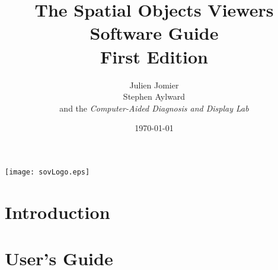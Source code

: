 \documentclass{InsightSoftwareGuide}
\title{The Spatial Objects Viewers\\Software Guide\\First Edition}
\author{Julien Jomier\\Stephen Aylward\\
and the \emph{Computer-Aided Diagnosis and Display Lab}}
\date{\today}
\newif\ifitkFullVersion
\begin{document}
\maketitle





%
%

\begin{minipage}[t][10cm][b]{\textwidth}
\center
\texttt{[image: sovLogo.eps]}
\normalsize
\end{minipage}



%
\pagestyle{plain}
%

\ifitkFullVersion 


\fi



%
%


%
\pagestyle{normal}
%
\small
\tableofcontents
\normalsize




% 
% 

\mainmatter

\part{Introduction}

\ifitkFullVersion

%
%
\fi


\part{User's Guide}

%
\end{document}
